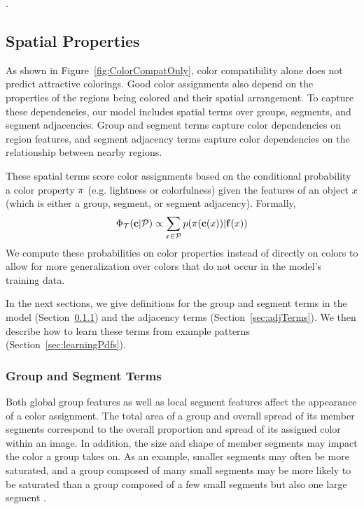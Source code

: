 .


\subsection{Spatial Properties}
\label{sec:spatialCompat}

As shown in Figure~\ref{fig:ColorCompatOnly}, color compatibility alone does not predict attractive colorings. Good color assignments also depend on the properties of the regions being colored and their spatial arrangement. To capture these dependencies, our model includes spatial terms over groups, segments, and segment adjacencies. Group and segment terms capture color dependencies on region features, and segment adjacency terms capture color dependencies on the relationship between nearby regions.

These spatial terms score color assignments based on the conditional probability a color property $\pi$ (e.g. lightness or colorfulness) given the features of an object $x$ (which is either a group, segment, or segment adjacency). Formally,
\begin{equation*}
\Phi_{\mathcal{T}}(\mathbf{c} | \mathcal{P}) \propto  \sum_{x \in \mathcal{P}} p(\pi(\mathbf{c}(x)) | \mathbf{f}(x))
\end{equation*}
We compute these probabilities on color properties instead of directly on colors to allow for more generalization over colors that do not occur in the model's training data.

In the next sections, we give definitions for the group and segment terms in the model (Section~\ref{sec:groupAndSegTerms}) and the adjacency terms (Section~\ref{sec:adjTerms}). We then describe how to learn these terms from example patterns (Section~\ref{sec:learningPdfs}).

\subsubsection{Group and Segment Terms}
\label{sec:groupAndSegTerms}

Both global group features as well as local segment features affect the appearance of a color assignment. The total area of a group and overall spread of its member segments correspond to the overall proportion and spread of its assigned color within an image. In addition, the size and shape of member segments may impact the color a group takes on. As an example, smaller segments may often be more saturated, and a group composed of many small segments may be more likely to be saturated than a group composed of a few small segments but also one large segment .

